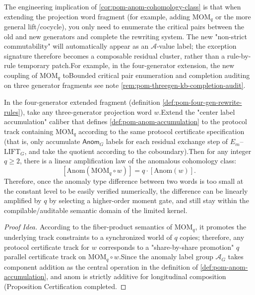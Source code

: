 \begin{remark}\label{rem:pom-anom-completion}The engineering implication of \ref{cor:pom-anom-cohomology-class} is that when extending the projection word fragment (for example, adding \(\mathrm{MOM}_q\) or the more general lift/cocycle), you only need to enumerate the critical pairs between the old and new generators and complete the rewriting system. The new "non-strict commutability" will automatically appear as an \(\mathcal{A}\)-value label; the exception signature therefore becomes a composable residual cluster, rather than a rule-by-rule temporary patch.For example, in the four-generator extension, the new coupling of \(\mathrm{MOM}_q\) toBounded critical pair enumeration and completion auditing on three generator fragments see note \ref{rem:pom-threegen-kb-completion-audit}.\end{remark}

\begin{proposition}\label{prop:pom-anom-moment-amplification}In the four-generator extended fragment (definition \ref{def:pom-four-gen-rewrite-rules}), take any three-generator projection word \(w\).Extend the "center label accumulation" caliber that defines \ref{def:pom-anom-accumulation} to the protocol track containing \(\mathrm{MOM}_q\) according to the same protocol certificate specification (that is, only accumulate \(\mathsf{Anom}_G\) labels for each residual exchange step of \(E_m\)--\(\mathrm{LIFT}_G\), and take the quotient according to the coboundary).Then for any integer \(q\ge 2\), there is a linear amplification law of the anomalous cohomology class:\[
\boxed{\;
[\mathrm{Anom}(\mathrm{MOM}_q\circ w)]
=
q\cdot [\mathrm{Anom}(w)].\;}
\]
Therefore, once the anomaly type difference between two words is too small at the constant level to be easily verified numerically, the difference can be linearly amplified by \(q\) by selecting a higher-order moment gate, and still stay within the compilable/auditable semantic domain of the limited kernel.\end{proposition}

\begin{proof}[Proof Idea]According to the fiber-product semantics of \(\mathrm{MOM}_q\), it promotes the underlying track constraints to a synchronized world of \(q\) copies; therefore, any protocol certificate track for \(w\) corresponds to a "share-by-share promotion" \(q\) parallel certificate track on \(\mathrm{MOM}_q\circ w\).Since the anomaly label group \(\mathcal{A}_G\) takes component addition as the central operation in the definition of \ref{def:pom-anom-accumulation}, and \(\mathrm{anom}\) is strictly additive for longitudinal composition (Proposition Certification completed.\end{proof}

